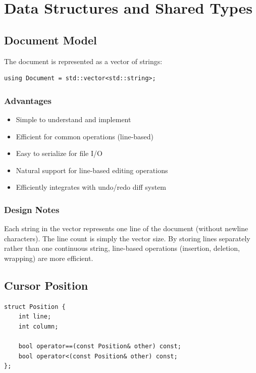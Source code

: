 \documentclass[12pt,a4paper,oneside,openany]{report}
\begin{document}
\chapter{Data Structures and Shared Types}

\section{Document Model}

The document is represented as a vector of strings:

\begin{lstlisting}
using Document = std::vector<std::string>;
\end{lstlisting}

\subsection{Advantages}

\begin{itemize}
	\item Simple to understand and implement
	\item Efficient for common operations (line-based)
	\item Easy to serialize for file I/O
	\item Natural support for line-based editing operations
	\item Efficiently integrates with undo/redo diff system
\end{itemize}

\subsection{Design Notes}

Each string in the vector represents one line of the document (without newline characters). The line count is simply the vector size. By storing lines separately rather than one continuous string, line-based operations (insertion, deletion, wrapping) are more efficient.

\section{Cursor Position}

\begin{lstlisting}
struct Position {
    int line;
    int column;
    
    bool operator==(const Position& other) const;
    bool operator<(const Position& other) const;
};
\end{lstlisting}
\end{document}
